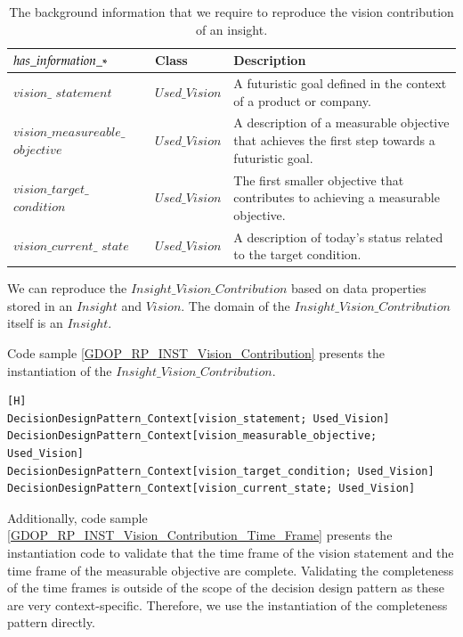 \begin{table}[H]
\centering
\caption{The background information that we require to reproduce the vision contribution of an insight.}
\begin{tabular}{| p{3cm} | p{2cm} | p{10cm} | }
\hline
\rowcolor{document}
\color{documentText}$has\_in{\mkern-2mu f\mkern-3mu}ormation\_*$ & \color{documentText}Class & \color{documentText}Description  \\
\hline
$vision\_$ $statement$ & $Used\_Vision$ & A futuristic goal defined in the context of a product or company. \\ 
\hdashline
$vision\_measureable\_$ $objective$ & $Used\_Vision$ & A description of a measurable objective that achieves the first step towards a futuristic goal. \\ 
\hdashline
$vision\_target\_ $ $condition$ & $Used\_Vision$ & The first smaller objective that contributes to achieving a measurable objective. \\ 
\hdashline
$vision\_current\_ $ $state$ & $Used\_Vision$ & A description of today's status related to the target condition. \\ 
\hline
\end{tabular}
\label{table:rp_vision_contribution}
\end{table}

We can reproduce the $Insight\_Vision\_Contribution$ based on data properties stored in an $Insight$ and $Vision$. The domain of the $Insight\_Vision\_Contribution$ itself is an $Insight$. 

Code sample \ref{GDOP_RP_INST_Vision_Contribution} presents the instantiation of the $Insight\_Vision\_Contribution$. 

\begin{lstlisting}[float,language=GDOL,caption={The GDOL instantiation code of the information reproducing the $Insight\_Vision\_Contribution$},label={GDOP_RP_INST_Vision_Contribution}][H]
DecisionDesignPattern_Context[vision_statement; Used_Vision] 
DecisionDesignPattern_Context[vision_measurable_objective; Used_Vision]
DecisionDesignPattern_Context[vision_target_condition; Used_Vision]
DecisionDesignPattern_Context[vision_current_state; Used_Vision]
\end{lstlisting}

Additionally, code sample \ref{GDOP_RP_INST_Vision_Contribution_Time_Frame} presents the instantiation code to validate that the time frame of the vision statement and the time frame of the measurable objective are complete. Validating the completeness of the time frames is outside of the scope of the decision design pattern as these are very context-specific. Therefore, we use the instantiation of the completeness pattern directly.

